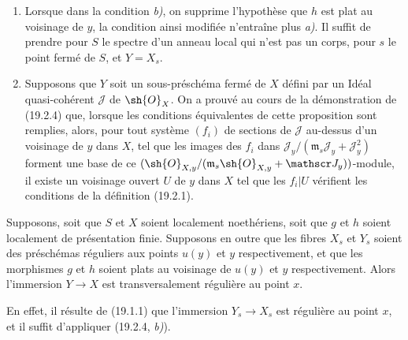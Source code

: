 \begin{remarks}[19.2.5]
\label{IV.19.2.5}
\begin{enumerate}
  \item[(i)] Lorsque dans la condition \emph{b)}, on supprime l'hypothèse que $h$ est plat au voisinage de $y$, la condition ainsi modifiée n'entraîne plus \emph{a)}. Il suffit de prendre pour $S$ le spectre d'un anneau local qui n'est pas un corps, pour $s$ le point fermé de $S$, et $Y=X_s$.
  \item[(ii)] Supposons que $Y$ soit un sous-préschéma fermé de $X$ défini par un Idéal quasi-cohérent $\mathscr J$ de $\sh{O}_X$. On a prouvé au cours de la démonstration de (19.2.4) que, lorsque les conditions équivalentes de cette proposition sont remplies, alors, pour tout système $(f_i)$ de sections de $\mathscr J$ au-dessus d'un voisinage de $y$ dans $X$, tel que les images des $f_i$ dans $\mathscr J_y/(\mathfrak m_s\mathscr J_y+\mathscr J_y^2)$ forment une base de ce $(\sh{O}_{X,y}/(\mathfrak m_s\sh{O}_{X,y}+\mathscr J_y))$-module, il existe un voisinage ouvert $U$ de $y$ dans $X$ tel que les $f_i|U$ vérifient les conditions de la définition (19.2.1).
\end{enumerate}
\end{remarks}


\begin{corollary}[19.2.6]
\label{IV.19.2.6}
Supposons, \textup{soit} que $S$ et $X$ soient localement noethériens, \textup{soit} que $g$ et $h$ soient localement de présentation finie. Supposons en outre que les fibres $X_s$ et $Y_s$ soient des préschémas réguliers aux points $u(y)$ et $y$ respectivement, et que les morphismes $g$ et $h$ soient plats au voisinage de $u(y)$ et $y$ respectivement. Alors l'immersion $Y\to X$ est transversalement régulière au point $x$.
\end{corollary}

En effet, il résulte de (19.1.1) que l'immersion $Y_s\to X_s$ est régulière au point $x$, et il suffit d'appliquer (19.2.4, \emph{b)}).

